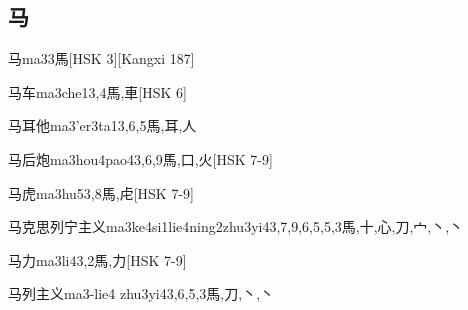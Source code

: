 \subsection*{马}

\begin{EntryWithPhonetic}{马}{ma3}{3}{⾺}[HSK 3][Kangxi 187]
\end{EntryWithPhonetic}

\begin{EntryWithPhonetic}{马车}{ma3che1}{3,4}{⾺,⾞}[HSK 6]
\end{EntryWithPhonetic}

\begin{EntryWithPhonetic}{马耳他}{ma3'er3ta1}{3,6,5}{⾺,⽿,⼈}
\end{EntryWithPhonetic}

\begin{EntryWithPhonetic}{马后炮}{ma3hou4pao4}{3,6,9}{⾺,⼝,⽕}[HSK 7-9]
\end{EntryWithPhonetic}

\begin{EntryWithPhonetic}{马虎}{ma3hu5}{3,8}{⾺,⾌}[HSK 7-9]
\end{EntryWithPhonetic}

\begin{EntryWithPhonetic}{马克思列宁主义}{ma3ke4si1lie4ning2zhu3yi4}{3,7,9,6,5,5,3}{⾺,⼗,⼼,⼑,⼧,⼂,⼂}
\end{EntryWithPhonetic}

\begin{EntryWithPhonetic}{马力}{ma3li4}{3,2}{⾺,⼒}[HSK 7-9]
\end{EntryWithPhonetic}

\begin{EntryWithPhonetic}{马列主义}{ma3-lie4 zhu3yi4}{3,6,5,3}{⾺,⼑,⼂,⼂}
\end{EntryWithPhonetic}

